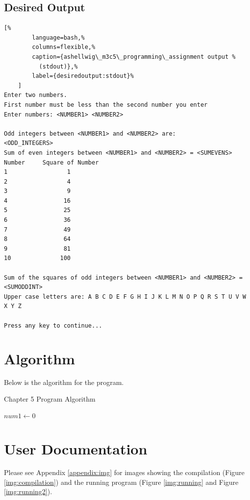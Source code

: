 \documentclass[a4paper, 11pt]{article}
\begin{document}
    \subsection{Desired Output}
      \begin{lstlisting}[%
        language=bash,%
        columns=flexible,%
        caption={ashellwig\_m3c5\_programming\_assignment output %
          (stdout)},%
        label={desiredoutput:stdout}%
    ]
Enter two numbers.
First number must be less than the second number you enter
Enter numbers: <NUMBER1> <NUMBER2>

Odd integers between <NUMBER1> and <NUMBER2> are:
<ODD_INTEGERS>
Sum of even integers between <NUMBER1> and <NUMBER2> = <SUMEVENS>
Number     Square of Number
1                 1
2                 4
3                 9
4                16
5                25
6                36
7                49
8                64
9                81
10              100

Sum of the squares of odd integers between <NUMBER1> and <NUMBER2> = <SUMODDINT>
Upper case letters are: A B C D E F G H I J K L M N O P Q R S T U V W X Y Z

Press any key to continue...
      \end{lstlisting}


  \newpage
  \section{Algorithm}
    Below is the algorithm for the program.
    \begin{algorithm}[h]
      \caption{Chapter 5 Program Algorithm}
      \vspace{12pt}
      \begin{algorithmic}[1]
          \State $num1\gets0$
          \State{}
        \EndFunction
      \end{algorithmic}
      \label{alg:c3program}
    \end{algorithm}


  \newpage
  
  \section{User Documentation}
    Please see Appendix \ref{appendix:img} for images showing the compilation
      (Figure \ref{img:compilation}) and the running program (Figure
      \ref{img:running} and Figure \ref{img:running2}).
\end{document}
